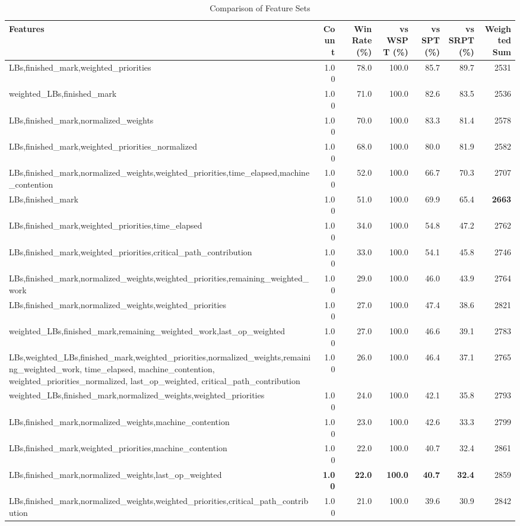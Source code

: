\begin{table}[htbp]%
\centering%
\begin{tabular}{lrrrrrr}%
\toprule%
\textbf{Features}&\textbf{Count}&\textbf{Win Rate (\%)}&\textbf{vs WSPT (\%)}&\textbf{vs SPT (\%)}&\textbf{vs SRPT (\%)}&\textbf{Weighted Sum}\\%
\midrule%
LBs,finished_mark,weighted_priorities&1.00&78.0&100.0&85.7&89.7&2531\\%
weighted_LBs,finished_mark&1.00&71.0&100.0&82.6&83.5&2536\\%
LBs,finished_mark,normalized_weights&1.00&70.0&100.0&83.3&81.4&2578\\%
LBs,finished_mark,weighted_priorities_normalized&1.00&68.0&100.0&80.0&81.9&2582\\%
LBs,finished_mark,normalized_weights,weighted_priorities,time_elapsed,machine_contention&1.00&52.0&100.0&66.7&70.3&2707\\%
LBs,finished_mark&1.00&51.0&100.0&69.9&65.4&\textbf{2663}\\%
LBs,finished_mark,weighted_priorities,time_elapsed&1.00&34.0&100.0&54.8&47.2&2762\\%
LBs,finished_mark,weighted_priorities,critical_path_contribution&1.00&33.0&100.0&54.1&45.8&2746\\%
LBs,finished_mark,normalized_weights,weighted_priorities,remaining_weighted_work&1.00&29.0&100.0&46.0&43.9&2764\\%
LBs,finished_mark,normalized_weights,weighted_priorities&1.00&27.0&100.0&47.4&38.6&2821\\%
weighted_LBs,finished_mark,remaining_weighted_work,last_op_weighted&1.00&27.0&100.0&46.6&39.1&2783\\%
LBs,weighted_LBs,finished_mark,weighted_priorities,normalized_weights,remaining_weighted_work, time_elapsed, machine_contention, weighted_priorities_normalized, last_op_weighted, critical_path_contribution&1.00&26.0&100.0&46.4&37.1&2765\\%
weighted_LBs,finished_mark,normalized_weights,weighted_priorities&1.00&24.0&100.0&42.1&35.8&2793\\%
LBs,finished_mark,normalized_weights,machine_contention&1.00&23.0&100.0&42.6&33.3&2799\\%
LBs,finished_mark,weighted_priorities,machine_contention&1.00&22.0&100.0&40.7&32.4&2861\\%
LBs,finished_mark,normalized_weights,last_op_weighted&\textbf{1.00}&\textbf{22.0}&\textbf{100.0}&\textbf{40.7}&\textbf{32.4}&2859\\%
LBs,finished_mark,normalized_weights,weighted_priorities,critical_path_contribution&1.00&21.0&100.0&39.6&30.9&2842\\%
\bottomrule%
\end{tabular}%
\caption{Comparison of Feature Sets}%
\label{tab:features}%
\end{table}